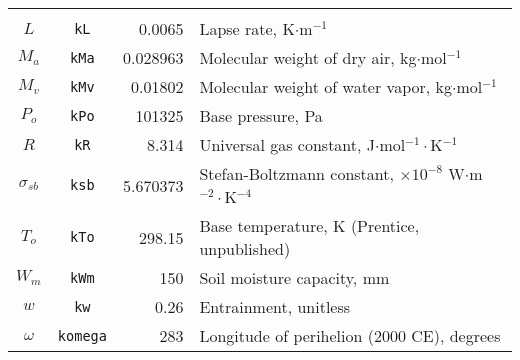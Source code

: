 \begin{longtable}{c c r p{6cm}}
        \parencite{kopp11} \\
    $L$ & \texttt{kL} & 0.0065 & 
        Lapse rate, K$\cdot$m$^{-1}$ 
        \parencite{cavcar00} \\
    $M_a$ & \texttt{kMa} & 0.028963 &
        Molecular weight of dry air, kg$\cdot$mol$^{-1}$ 
        \parencite{tsilingiris08} \\
    $M_v$ & \texttt{kMv} & 0.01802 &
        Molecular weight of water vapor, kg$\cdot$mol$^{-1}$
        \parencite{tsilingiris08} \\
    $P_o$ & \texttt{kPo} & 101325 &
        Base pressure, Pa 
        \parencite{cavcar00} \\
    $R$ & \texttt{kR} & 8.314 &
        Universal gas constant, J$\cdot$mol$^{-1}\cdot$K$^{-1}$ \\
    $\sigma_{sb}$ & \texttt{ksb} & 5.670373 &
        Stefan-Boltzmann constant, $\times 10^{-8}$ 
        W$\cdot$m$^{-2}\cdot$K$^{-4}$ \\
    $T_o$ & \texttt{kTo} & 298.15 &
        Base temperature, K 
        (Prentice, unpublished) \\
    $W_m$ & \texttt{kWm} & 150 &
        Soil moisture capacity, mm  
        \parencite{cramer88} \\
    $w$ & \texttt{kw} & 0.26 & 
        Entrainment, unitless 
        \parencite{lhomme97,priestley72} \\
    $\omega$ & \texttt{komega} & 283 & 
        Longitude of perihelion (2000 CE), degrees 
        \parencite{berger78} \\
        \hline
\end{longtable}

